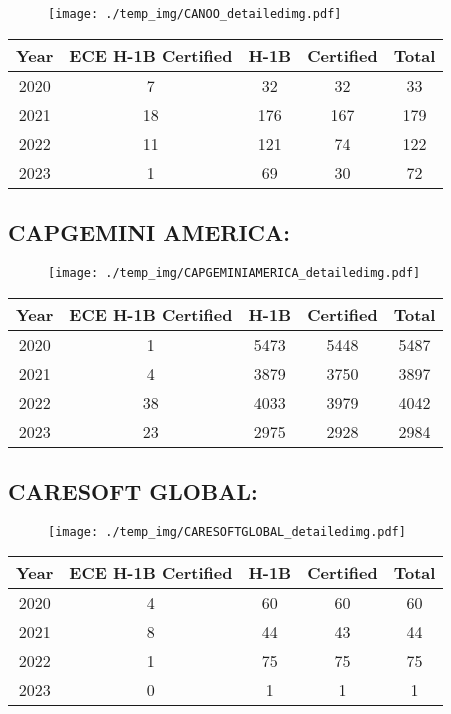 \documentclass{article}%
\begin{document}
\begin{figure}[htbp]%
\centering%
\texttt{[image: ./temp\_img/CANOO\_detailedimg.pdf]}%
\end{figure}

%
\begin{longtable}{c|c|c|c|c}%
\hline%
Year&ECE H{-}1B Certified&H{-}1B&Certified&Total\\%
\hline%
2020&7&32&32&33\\%
\hline%
2021&18&176&167&179\\%
\hline%
2022&11&121&74&122\\%
\hline%
2023&1&69&30&72\\%
\hline%
\end{longtable}

%
\newpage%
\subsection{CAPGEMINI AMERICA:}%
\label{subsec:CAPGEMINIAMERICA}%
\label{CAPGEMINIAMERICAdetailed}%


\begin{figure}[htbp]%
\centering%
\texttt{[image: ./temp\_img/CAPGEMINIAMERICA\_detailedimg.pdf]}%
\end{figure}

%
\begin{longtable}{c|c|c|c|c}%
\hline%
Year&ECE H{-}1B Certified&H{-}1B&Certified&Total\\%
\hline%
2020&1&5473&5448&5487\\%
\hline%
2021&4&3879&3750&3897\\%
\hline%
2022&38&4033&3979&4042\\%
\hline%
2023&23&2975&2928&2984\\%
\hline%
\end{longtable}

%
\newpage%
\subsection{CARESOFT GLOBAL:}%
\label{subsec:CARESOFTGLOBAL}%
\label{CARESOFTGLOBALdetailed}%


\begin{figure}[htbp]%
\centering%
\texttt{[image: ./temp\_img/CARESOFTGLOBAL\_detailedimg.pdf]}%
\end{figure}

%
\begin{longtable}{c|c|c|c|c}%
\hline%
Year&ECE H{-}1B Certified&H{-}1B&Certified&Total\\%
\hline%
2020&4&60&60&60\\%
\hline%
2021&8&44&43&44\\%
\hline%
2022&1&75&75&75\\%
\hline%
2023&0&1&1&1\\%
\hline%
\end{longtable}
\end{document}
